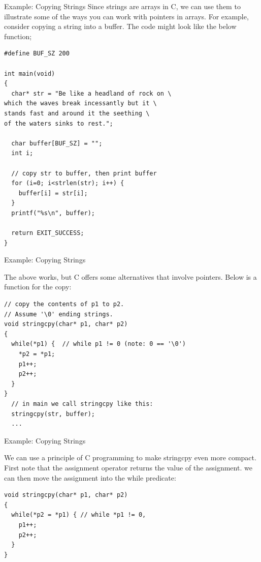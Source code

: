 \documentclass[10pt]{beamer}
\begin{document}
\begin{frame}[fragile]{Example: Copying Strings}
Since strings are arrays in C, we can use them to illustrate some of the ways you can work with pointers in arrays.  For example, consider copying a string into a buffer.  The code might look like the below function;

\fontsize{8pt}{8pt}
\selectfont
\begin{verbatim}
#define BUF_SZ 200

int main(void)
{
  char* str = "Be like a headland of rock on \
which the waves break incessantly but it \
stands fast and around it the seething \
of the waters sinks to rest.";

  char buffer[BUF_SZ] = "";
  int i;

  // copy str to buffer, then print buffer
  for (i=0; i<strlen(str); i++) {
    buffer[i] = str[i];
  }
  printf("%s\n", buffer);

  return EXIT_SUCCESS;
}
\end{verbatim}

\end{frame}
\begin{frame}[fragile]{Example: Copying Strings}

The above works, but C offers some alternatives that involve pointers.  Below is a function for the copy:

\begin{verbatim}
// copy the contents of p1 to p2.  
// Assume '\0' ending strings.
void stringcpy(char* p1, char* p2)
{
  while(*p1) {  // while p1 != 0 (note: 0 == '\0')
    *p2 = *p1;
    p1++;
    p2++;
  }
}
  // in main we call stringcpy like this:
  stringcpy(str, buffer);
  ...
\end{verbatim}

\end{frame}
\begin{frame}[fragile]{Example: Copying Strings}

We can use a  principle of C programming to make stringcpy even more compact.  First note that the assignment operator returns the value of the assignment.  we can then move the assignment into the while predicate:

\begin{verbatim}
void stringcpy(char* p1, char* p2)
{
  while(*p2 = *p1) { // while *p1 != 0,
    p1++;
    p2++;
  }
}
\end{verbatim}

\end{frame}
\end{document}
